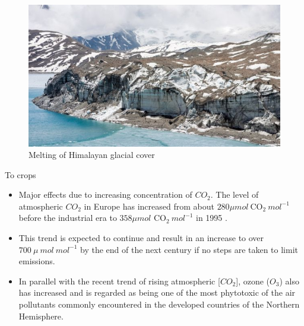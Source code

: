 \documentclass[
  ignorenonframetext,
  aspectratio=169]{beamer}
\providecommand{\tightlist}{%
  \setlength{\itemsep}{0pt}\setlength{\parskip}{0pt}}
\begin{document}
\begin{frame}{}
\protect\hypertarget{section-1}{}
\begin{figure}
\includegraphics[width=0.7\linewidth]{../images/mountain_agriculture/himalayan_glacier_melting} \caption{Melting of Himalayan glacial cover}\label{fig:climate-change-everest}
\end{figure}
\end{frame}

\begin{frame}{To crops}
\protect\hypertarget{to-crops}{}
\begin{itemize}
\tightlist
\item
  Major effects due to increasing concentration of \(CO_2\). The level
  of atmospheric \(CO_2\) in Europe has increased from about
  \(280 \mu mol~\mathrm{CO_2}~mol^{-1}\) before the industrial era to
  \(358 \mu mol\) \(\mathrm{CO_2}~mol^{-1}\) in 1995 .
\item
  This trend is expected to continue and result in an increase to over
  \(700~\mu~mol~mol^{-1}\) by the end of the next century if no steps
  are taken to limit emissions.
\item
  In parallel with the recent trend of rising atmospheric
  {[}\(CO_2\){]}, ozone (\(O_3\)) also has increased and is regarded as
  being one of the most phytotoxic of the air pollutants commonly
  encountered in the developed countries of the Northern Hemisphere.
\end{itemize}
\end{frame}
\end{document}
